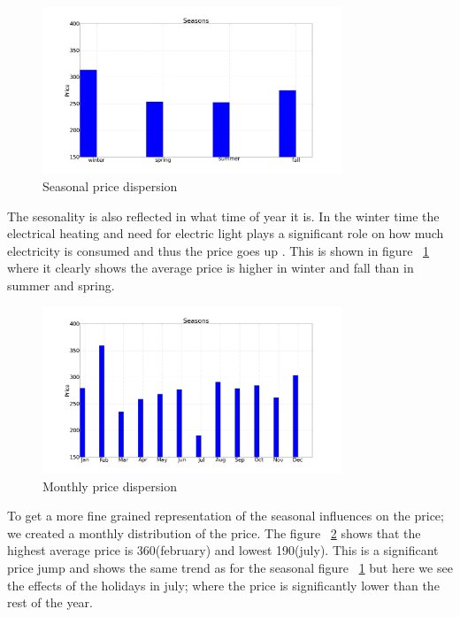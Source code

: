\begin{figure}[H]
\centering
\includegraphics[width=0.8\textwidth ]{billeder/energy_price_plots/seasons.png}
\caption{Seasonal price dispersion}
\label{fig:seasons}
\end{figure}

The sesonality is also reflected in what time of year it is. In the winter time the electrical heating and need for electric light plays a significant role on how much electricity is consumed and thus the price goes up \cite{crowley2005weather}. This is shown in figure ~\ref{fig:seasons} where it clearly shows the average price is higher in winter and fall than in summer and spring.

\begin{figure}[H]
\centering
\includegraphics[width=0.8\textwidth ]{billeder/energy_price_plots/averageMonthlyPrice.png}
\caption{Monthly price dispersion}
\label{fig:monthlyAveragePrice}
\end{figure}

To get a more fine grained representation of the seasonal influences on the price; we created a monthly distribution of the price. The figure ~\ref{fig:monthlyAveragePrice} shows that the highest average price is 360(february) and lowest 190(july). This is a significant price jump and shows the same trend as for the seasonal figure ~\ref{fig:seasons} but here we see the effects of the holidays in july; where the price is significantly lower than the rest of the year.

